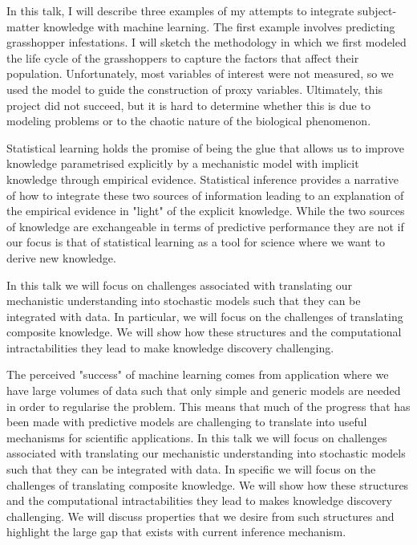 \license

In this talk, I will describe three examples of my attempts to integrate subject-matter knowledge with machine learning. The first example involves predicting grasshopper infestations. I will sketch the methodology in which we first modeled the life cycle of the grasshoppers to capture the factors that affect their population. Unfortunately, most variables of interest were not measured, so we used the model to guide the construction of proxy variables. Ultimately, this project did not succeed, but it is hard to determine whether this is due to modeling problems or to the chaotic nature of the biological phenomenon.

\license

Statistical learning holds the promise of being the glue that allows us to improve knowledge parametrised explicitly by a mechanistic model with implicit knowledge through empirical evidence. Statistical inference provides a narrative of how to integrate these two sources of information leading to an explanation of the empirical evidence in "light" of the explicit knowledge. While the two sources of knowledge are exchangeable in terms of predictive performance they are not if our focus is that of statistical learning as a tool for science where we want to derive new knowledge.

In this talk we will focus on challenges associated with translating our mechanistic understanding into stochastic models such that they can be integrated with data. In particular, we will focus on the challenges of translating composite knowledge. We will show how these structures and the computational intractabilities they lead to make knowledge discovery challenging. 

The perceived "success" of machine learning comes from application where we have large volumes of data such that only simple and generic models are needed in order to regularise the problem. This means that much of the progress that has been made with predictive models are challenging to translate into useful mechanisms for scientific applications. In this talk we will focus on challenges associated with translating our mechanistic understanding into stochastic models such that they can be integrated with data. In specific we will focus on the challenges of translating composite knowledge. We will show how these structures and the computational intractabilities they lead to makes knowledge discovery challenging. We will discuss properties that we desire from such structures and highlight the large gap that exists with current inference mechanism.

